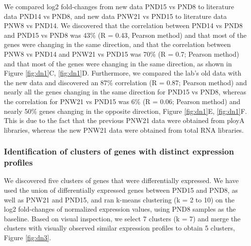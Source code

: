\documentclass[12pt,twoside]{reedthesis}
\begin{document}
We compared log2 fold-changes from new data PND15 vs PND8 to literature
data PND14 vs PND8, and new data PNW21 vs PND15 to literature data PNW8
vs PND14. We discovered that the correlation between PND14 vs PND8 and
PND15 vs PND8 was 43\% (R = 0.43, Pearson method) and that most of the
genes were changing in the same direction, and that the correlation
between PNW8 vs PND14 and PNW21 vs PND15 was 70\% (R = 0.7; Pearson
method) and that most of the genes were changing in the same direction,
as shown in Figure \ref{fig:dn1}C, \ref{fig:dn1}D. Furthermore, we compared the lab's old data
with the new data and discovered an 87\% correlation (R = 0.87; Pearson
method) and nearly all the genes changing in the same direction for
PND15 vs PND8, whereas the correlation for PNW21 vs PND15 was 6\% (R =
0.06; Pearson method) and nearly 50\% genes changing in the opposite
direction, Figure \ref{fig:dn1}E, \ref{fig:dn1}F. This is due to the fact that the previous
PNW21 data were obtained from ployA libraries, whereas the new PNW21
data were obtained from total RNA libraries.

\hypertarget{identification-of-clusters-of-genes-with-distinct-expression-profiles}{%
\subsubsection{Identification of clusters of genes with distinct expression profiles}\label{identification-of-clusters-of-genes-with-distinct-expression-profiles}}

We discovered five clusters of genes that were differentially expressed.
We have used the union of differentially expressed genes between PND15
and PND8, as well as PNW21 and PND15, and ran k-means clustering (k = 2
to 10) on the log2 fold-changes of normalized expression values, using
PND8 samples as the baseline. Based on visual inspection, we select 7
clusters (k = 7) and merge the clusters with visually observed similar
expression profiles to obtain 5 clusters, Figure \ref{fig:dn3}.
\end{document}
